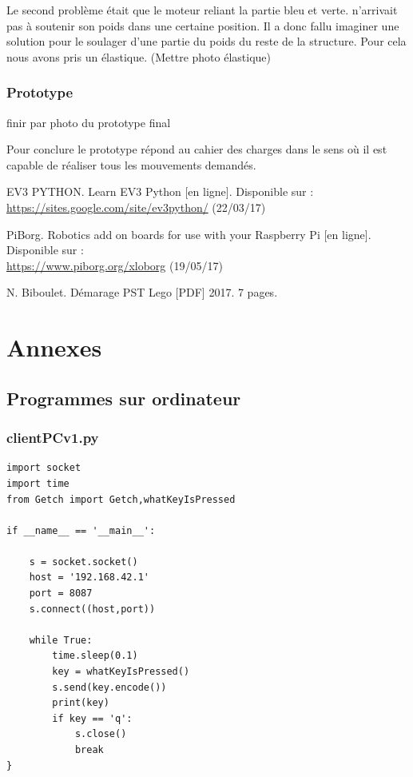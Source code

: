 \documentclass[twoside,twocolumn, 16pt]{article}
\begin{document}
Le second problème était que le moteur reliant la partie bleu et verte. n’arrivait pas à soutenir son poids dans une certaine position. Il a donc fallu imaginer une solution pour le soulager d’une partie du poids du reste de la structure.
Pour cela nous avons pris un élastique. (Mettre photo élastique)

\subsubsection{Prototype}
finir par photo du prototype final

Pour conclure le prototype répond au cahier des charges dans le sens où il est capable de réaliser tous les mouvements demandés.


\begin{thebibliography}{99} %

EV3 PYTHON. Learn EV3 Python [en ligne]. Disponible sur : \\\url{https://sites.google.com/site/ev3python/} (22/03/17)

PiBorg. Robotics add on boards for use with your Raspberry Pi [en ligne]. Disponible sur : \\
\url{https://www.piborg.org/xloborg} (19/05/17)
 
 N. Biboulet. Démarage PST Lego [PDF] 2017. 7 pages.
\end{thebibliography}

\newpage
\section{Annexes}
\subsection{Programmes sur ordinateur}
\subsubsection{clientPCv1.py}
\begin{lstlisting}
import socket
import time
from Getch import Getch,whatKeyIsPressed

if __name__ == '__main__':
	
	s = socket.socket()
	host = '192.168.42.1'
	port = 8087
	s.connect((host,port))
	
	while True:
		time.sleep(0.1)
		key = whatKeyIsPressed()
		s.send(key.encode())
		print(key)
		if key == 'q':
			s.close()
			break
}
\end{lstlisting}
\end{document}
